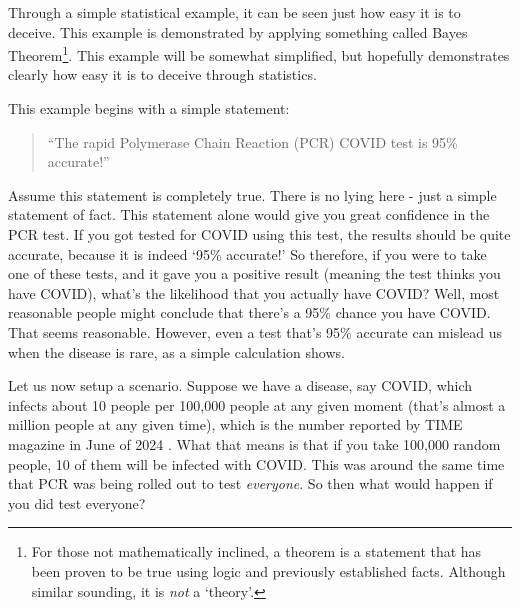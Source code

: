 \documentclass[10pt]{article}
\begin{document}
\begin{multicols}{2}
Through a simple statistical example, it can be seen just how easy it is to deceive. This example is demonstrated by applying something called Bayes Theorem\footnote{For those not mathematically inclined, a theorem is a statement that has been proven to be true using logic and previously established facts. Although similar sounding, it is \textit{not} a `theory'.}. This example will be somewhat simplified, but hopefully demonstrates clearly how easy it is to deceive through statistics. 

This example begins with a simple statement:
\begin{quotation}
``The rapid Polymerase Chain Reaction (PCR) COVID test is 95\% accurate!''
\end{quotation}
Assume this statement is completely true. There is no lying here - just a simple statement of fact. This statement alone would give you great confidence in the PCR test. If you got tested for COVID using this test, the results should be quite accurate, because it is indeed `95\% accurate!' So therefore, if you were to take one of these tests, and it gave you a positive result (meaning the test thinks you have COVID), what's the likelihood that you actually have COVID? Well, most reasonable people might conclude that there's a 95\% chance you have COVID. That seems reasonable. However, even a test that's 95\% accurate can mislead us when the disease is rare, as a simple calculation shows.

Let us now setup a scenario. Suppose we have a disease, say COVID, which infects about 10 people per 100,000 people at any given moment (that's almost a million people at any given time), which is the number reported by TIME magazine in June of 2024 \cite{TIME}. What that means is that if you take 100,000 random people, 10 of them will be infected with COVID. This was around the same time that PCR was being rolled out to test \textit{everyone}. So then what would happen if you did test everyone?


\end{multicols}
\end{document}
